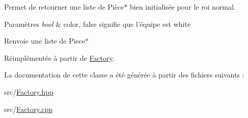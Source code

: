 Permet de retourner une liste de Pièce$\ast$ bien initialisée pour le roi normal. 


\begin{DoxyParams}{Paramètres}
{\em bool} & color, false signifie que l'équipe est white \\
\hline
\end{DoxyParams}
\begin{DoxyReturn}{Renvoie}
une liste de Piece$\ast$ 
\end{DoxyReturn}


Réimplémentée à partir de \hyperlink{class_factory_a90f20f663caa6e5a5370465d3014630f}{Factory}.



La documentation de cette classe a été générée à partir des fichiers suivants \-:\begin{DoxyCompactItemize}
\item 
src/\hyperlink{_factory_8hpp}{Factory.\-hpp}\item 
src/\hyperlink{_factory_8cpp}{Factory.\-cpp}\end{DoxyCompactItemize}
